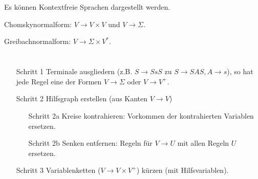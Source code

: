 \documentclass{article}
\begin{document}
\section{}


\section{}
Es können Kontextfreie Sprachen dargestellt werden.

Chomskynormalform: $V \rightarrow V \times V$ und $V \rightarrow \Sigma$.

Greibachnormalform: $V \rightarrow \Sigma \times V^*$.



\section{}
\begin{enumerate}
	\item[Schritt 1] Terminale ausgliedern (z.B. $S \rightarrow SsS$ zu $S \rightarrow SAS, A \rightarrow s$), so hat jede Regel eine der Formen $V\rightarrow \Sigma$ oder $V\rightarrow V^+$.
  \item[Schritt 2] Hilfsgraph erstellen (aus Kanten $V \rightarrow V$)
  \begin{enumerate}
    \item[Schritt 2a] Kreise kontrahieren: Vorkommen der kontrahierten Variablen ersetzen.
    \item[Schritt 2b] Senken entfernen: Regeln für $V\rightarrow U$ mit allen Regeln $U$ ersetzen.
  \end{enumerate}
  \item[Schritt 3] Variablenketten ($V \rightarrow V \times V^+$) kürzen (mit Hilfsvariablen).
\end{enumerate}
\end{document}
